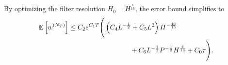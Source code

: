 \documentclass[review,onefignum,onetabnum]{siamart250211}
\begin{document}
\begin{corollary}
\label{cor:optimized_error}
By optimizing the filter resolution \(H_0 = H^{\frac{8}{13}}\), the error bound simplifies to
\begin{equation}
\begin{aligned}
\mathbb{E}\left[w^{\left(N_T\right)}\right] &\leq C_2 e^{C_1T}
\Bigg(
\left(C_4L^{-\frac{1}{2}}+C_5L^2\right)H^{-\frac{16}{13}} \\
&\hspace{3.2cm}
+C_6L^{-\frac{1}{2}}P^{-\frac{1}{2}}H^\frac{4}{13}+C_0 \tau
\Bigg).
\label{eq:main_results_opt}
\end{aligned}
\end{equation}
\end{corollary}

\end{document}
